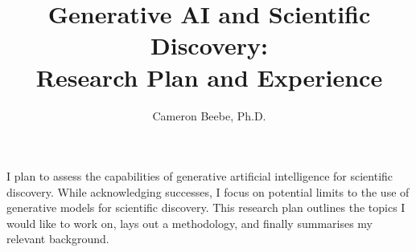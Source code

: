 \documentclass[11pt, oneside]{article}   	%
\title{Generative AI and Scientific Discovery: \\ Research Plan and Experience}
\author{Cameron Beebe, Ph.D.}
\begin{document}
\maketitle




I plan to assess the capabilities of generative artificial intelligence for scientific discovery. While acknowledging successes, I focus on potential limits to the use of generative models for scientific discovery.  This research plan outlines the topics I would like to work on, lays out a methodology, and finally summarises my relevant background.










\tableofcontents
\end{document}
